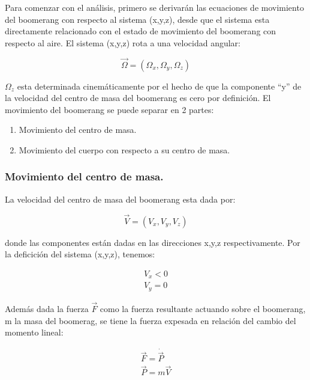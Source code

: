 	Para comenzar con el análisis, primero se derivarán las ecuaciones de movimiento del boomerang con respecto al sistema (x,y,z), desde que el sistema esta directamente relacionado con el estado de movimiento del boomerang con respecto al aire. El sistema (x,y,z) rota a una velocidad angular:


		\begin{equation}
		\vec{\Omega} = (\Omega_{x},\Omega_{y},\Omega_{z})
		\label{ec7}
		\end{equation} %

	$\Omega_{z}$ esta determinada cinemáticamente por el hecho de que la componente ``y'' de la velocidad del centro de masa del boomerang es cero por definición. El movimiento del boomerang se puede separar en 2 partes:

		\begin{enumerate}
		\item{Movimiento del centro de masa.}
		\item{Movimiento del cuerpo con respecto a su centro de masa.}
		\end{enumerate}

	\subsubsection{Movimiento del centro de masa.}

	La velocidad del centro de masa del boomerang esta dada por:

		\begin{equation}
		\vec{V} = (V_{x},V_{y},V_{z})
		\label{ec8}
		\end{equation} %


	donde las componentes están dadas en las direcciones x,y,z respectivamente. Por la deficición del sistema (x,y,z), tenemos:

		\begin{subequations}
		\begin{align}
    	V_{x} < 0 \\
		V_{y} = 0
		\end{align}
		\label{ec9}
		\end{subequations} %

	Además dada la fuerza $\vec{F}$ como la fuerza resultante actuando sobre el boomerang, m la masa del boomerag, se tiene la fuerza expesada en relación del cambio del momento lineal:

		\begin{subequations}
		\begin{align}
		\vec{F} = \dot{\vec{P}} \\
		\vec{P} = m\vec{V}
		\end{align}
		\label{ec10}
		\end{subequations} %

